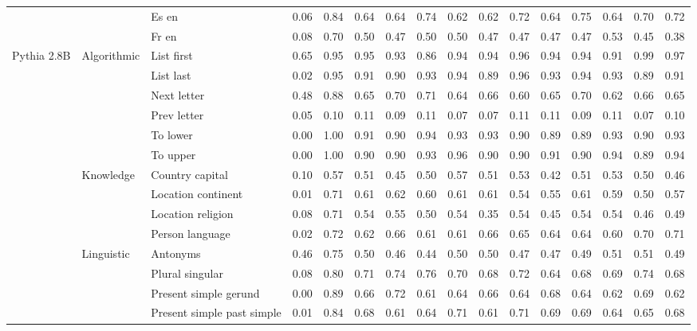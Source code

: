 \begin{center}
\begin{longtable}{lllrrrrrrrrrrrrr}
 &  & Es en & 0.06 & 0.84 & 0.64 & 0.64 & 0.74 & 0.62 & 0.62 & 0.72 & 0.64 & 0.75 & 0.64 & 0.70 & 0.72 \\
 &  & Fr en & 0.08 & 0.70 & 0.50 & 0.47 & 0.50 & 0.50 & 0.47 & 0.47 & 0.47 & 0.47 & 0.53 & 0.45 & 0.38 \\
\cline{1-16} \cline{2-16}
\multirow[t]{18}{*}{Pythia 2.8B} & \multirow[t]{6}{*}{Algorithmic} & List first & 0.65 & 0.95 & 0.95 & 0.93 & 0.86 & 0.94 & 0.94 & 0.96 & 0.94 & 0.94 & 0.91 & 0.99 & 0.97 \\
 &  & List last & 0.02 & 0.95 & 0.91 & 0.90 & 0.93 & 0.94 & 0.89 & 0.96 & 0.93 & 0.94 & 0.93 & 0.89 & 0.91 \\
 &  & Next letter & 0.48 & 0.88 & 0.65 & 0.70 & 0.71 & 0.64 & 0.66 & 0.60 & 0.65 & 0.70 & 0.62 & 0.66 & 0.65 \\
 &  & Prev letter & 0.05 & 0.10 & 0.11 & 0.09 & 0.11 & 0.07 & 0.07 & 0.11 & 0.11 & 0.09 & 0.11 & 0.07 & 0.10 \\
 &  & To lower & 0.00 & 1.00 & 0.91 & 0.90 & 0.94 & 0.93 & 0.93 & 0.90 & 0.89 & 0.89 & 0.93 & 0.90 & 0.93 \\
 &  & To upper & 0.00 & 1.00 & 0.90 & 0.90 & 0.93 & 0.96 & 0.90 & 0.90 & 0.91 & 0.90 & 0.94 & 0.89 & 0.94 \\
\cline{2-16}
 & \multirow[t]{4}{*}{Knowledge} & Country capital & 0.10 & 0.57 & 0.51 & 0.45 & 0.50 & 0.57 & 0.51 & 0.53 & 0.42 & 0.51 & 0.53 & 0.50 & 0.46 \\
 &  & Location continent & 0.01 & 0.71 & 0.61 & 0.62 & 0.60 & 0.61 & 0.61 & 0.54 & 0.55 & 0.61 & 0.59 & 0.50 & 0.57 \\
 &  & Location religion & 0.08 & 0.71 & 0.54 & 0.55 & 0.50 & 0.54 & 0.35 & 0.54 & 0.45 & 0.54 & 0.54 & 0.46 & 0.49 \\
 &  & Person language & 0.02 & 0.72 & 0.62 & 0.66 & 0.61 & 0.61 & 0.66 & 0.65 & 0.64 & 0.64 & 0.60 & 0.70 & 0.71 \\
\cline{2-16}
 & \multirow[t]{4}{*}{Linguistic} & Antonyms & 0.46 & 0.75 & 0.50 & 0.46 & 0.44 & 0.50 & 0.50 & 0.47 & 0.47 & 0.49 & 0.51 & 0.51 & 0.49 \\
 &  & Plural singular & 0.08 & 0.80 & 0.71 & 0.74 & 0.76 & 0.70 & 0.68 & 0.72 & 0.64 & 0.68 & 0.69 & 0.74 & 0.68 \\
 &  & Present simple gerund & 0.00 & 0.89 & 0.66 & 0.72 & 0.61 & 0.64 & 0.66 & 0.64 & 0.68 & 0.64 & 0.62 & 0.69 & 0.62 \\
 &  & Present simple past simple & 0.01 & 0.84 & 0.68 & 0.61 & 0.64 & 0.71 & 0.61 & 0.71 & 0.69 & 0.69 & 0.64 & 0.65 & 0.68 \\

\end{longtable}
\end{center}
